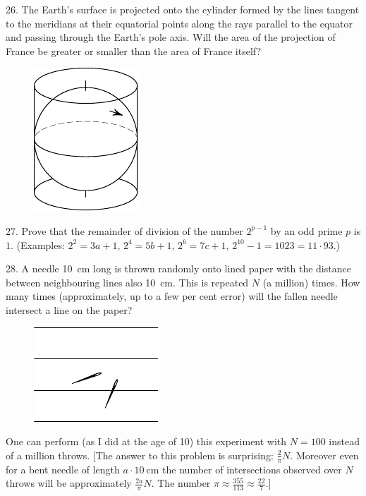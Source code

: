 \begin{problem}{26.}
	The Earth's surface is projected onto the cylinder formed by the lines tangent to the meridians
	at their equatorial points along the rays parallel to the equator and passing through the Earth's pole axis.
	Will the area of the projection of France be greater or smaller than the area of France itself?
	\begin{figure}
		\includegraphics{resources/taskbook-10}
	\end{figure}
\end{problem}

\begin{problem}{27.}
	Prove that the remainder of division of the number $2^{p-1}$ by an odd prime $p$ is $1$.
	(Examples: $2^2 = 3a + 1$, $2^4 = 5b+1$, $2^6 = 7c+1$, $2^{10} - 1 = 1023 = 11\cdot 93$.)
\end{problem}

\begin{problem}{28.}
	A needle \SI{10}{\cm} long is thrown randomly onto lined paper with the distance between neighbouring
	lines also \SI{10}{\cm}. This is repeated
	$N$ (a million) times.
	How many times (approximately, up to a few per
	cent error) will the fallen needle intersect a line on the paper?
	\begin{figure}
		\includegraphics{resources/taskbook-12}
	\end{figure}
	One can perform (as I did at the age of 10) this experiment with $N=100$ instead of a million throws.
	[The answer to this problem is surprising: $\frac2{\pi}N$. Moreover even for a bent needle of length $a \cdot \SI{10}{\cm}$ the number of intersections observed over $N$ throws will be approximately $\frac{2a}{\pi}N$.
	The number $\pi \approx  \frac{355}{113} \approx \frac{22}7.$]
\end{problem}

